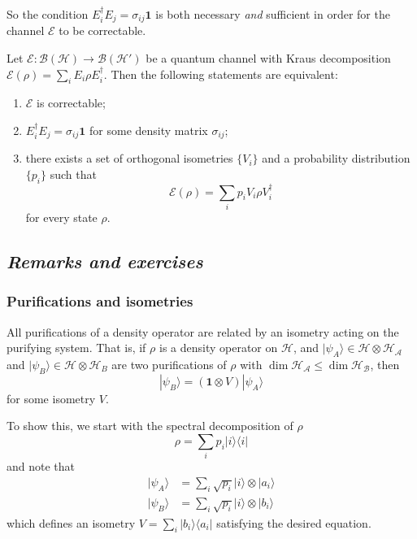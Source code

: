 \documentclass[fleqn]{article}
\newenvironment{idea}{\noindent}{\medskip}
\begin{document}
So the condition \(E_i^\dagger E_j = \sigma_{ij}\mathbf{1}\) is both necessary \emph{and} sufficient in order for the channel \(\mathcal{E}\) to be correctable.

\begin{idea}

Let \(\mathcal{E}\colon\mathcal{B}(\mathcal{H})\to\mathcal{B}(\mathcal{H}')\) be a quantum channel with Kraus decomposition \(\mathcal{E}(\rho)=\sum_i E_i\rho E^\dagger_i\).
Then the following statements are equivalent:

\begin{enumerate}
\def\labelenumi{\roman{enumi}.}
\item
  \(\mathcal{E}\) is correctable;
\item
  \(E_i^\dagger E_j = \sigma_{ij}\mathbf{1}\) for some density matrix \(\sigma_{ij}\);
\item
  there exists a set of orthogonal isometries \(\{V_i\}\) and a probability distribution \(\{p_i\}\) such that
  \[
      \mathcal{E} (\rho) = \sum_i p_i V_i\rho V^\dagger_i
      \]
  for every state \(\rho\).
\end{enumerate}

\end{idea}

\hypertarget{remarks-and-exercises-quantum-channels}{%
\subsection{\texorpdfstring{\emph{Remarks and exercises}}{Remarks and exercises}}\label{remarks-and-exercises-quantum-channels}}

\hypertarget{purifications-and-isometries}{%
\subsubsection{Purifications and isometries}\label{purifications-and-isometries}}

All purifications of a density operator are related by an isometry acting on the purifying system.
That is, if \(\rho\) is a density operator on \(\mathcal{H}\), and \(|\psi_A\rangle\in \mathcal{H}\otimes\mathcal{H}_\mathcal{A}\) and \(|\psi_B\rangle\in\mathcal{H}\otimes\mathcal{H}_B\) are two purifications of \(\rho\) with \(\dim\mathcal{H}_\mathcal{A}\leqslant\dim\mathcal{H}_\mathcal{B}\), then
\[
  |\psi_B\rangle=(\mathbf{1}\otimes V)|\psi_A\rangle
\]
for some isometry \(V\).

To show this, we start with the spectral decomposition of \(\rho\)
\[
  \rho = \sum_i p_i|i\rangle\langle i|
\]
and note that
\[
  \begin{aligned}
    |\psi_A\rangle
    &= \sum_i \sqrt{p_i} |i\rangle\otimes|a_i\rangle
  \\|\psi_B\rangle
    &= \sum_i \sqrt{p_i} |i\rangle\otimes|b_i\rangle
  \end{aligned}
\]
which defines an isometry \(V=\sum_i |b_i\rangle\langle a_i|\) satisfying the desired equation.
\end{document}
